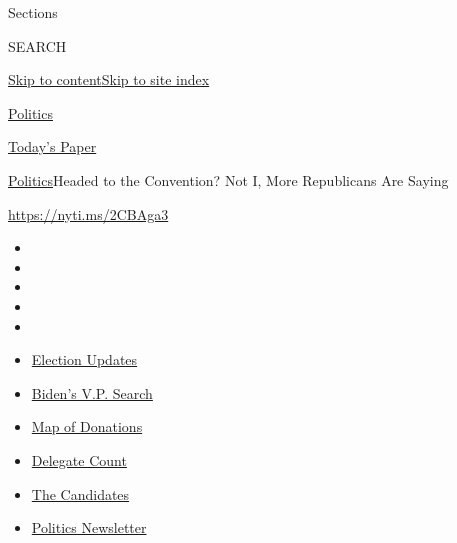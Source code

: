 Sections

SEARCH

\protect\hyperlink{site-content}{Skip to
content}\protect\hyperlink{site-index}{Skip to site index}

\href{https://www.nytimes3xbfgragh.onion/section/politics}{Politics}

\href{https://myaccount.nytimes3xbfgragh.onion/auth/login?response_type=cookie\&client_id=vi}{}

\href{https://www.nytimes3xbfgragh.onion/section/todayspaper}{Today's
Paper}

\href{/section/politics}{Politics}\textbar{}Headed to the Convention?
Not I, More Republicans Are Saying

\url{https://nyti.ms/2CBAga3}

\begin{itemize}
\item
\item
\item
\item
\item
\end{itemize}

\begin{itemize}
\item
  \href{https://www.nytimes3xbfgragh.onion/2020/08/04/us/elections/primary-election-michigan-arizona-kansas.html?action=click\&pgtype=Article\&state=default\&region=TOP_BANNER\&context=storylines_menu}{Election
  Updates}
\item
  \href{https://www.nytimes3xbfgragh.onion/article/biden-vice-president-2020.html?action=click\&pgtype=Article\&state=default\&region=TOP_BANNER\&context=storylines_menu}{Biden's
  V.P. Search}
\item
  \href{https://www.nytimes3xbfgragh.onion/interactive/2020/07/24/us/politics/trump-biden-campaign-donors.html?action=click\&pgtype=Article\&state=default\&region=TOP_BANNER\&context=storylines_menu}{Map
  of Donations}
\item
  \href{https://www.nytimes3xbfgragh.onion/interactive/2020/us/elections/delegate-count-primary-results.html?action=click\&pgtype=Article\&state=default\&region=TOP_BANNER\&context=storylines_menu}{Delegate
  Count}
\item
  \href{https://www.nytimes3xbfgragh.onion/interactive/2019/us/politics/2020-presidential-candidates.html?action=click\&pgtype=Article\&state=default\&region=TOP_BANNER\&context=storylines_menu}{The
  Candidates}
\item
  \href{https://www.nytimes3xbfgragh.onion/newsletters/politics?action=click\&pgtype=Article\&state=default\&region=TOP_BANNER\&context=storylines_menu}{Politics
  Newsletter}
\end{itemize}

